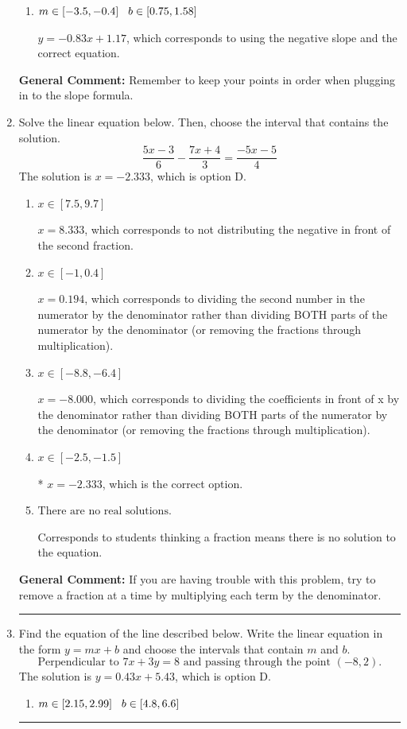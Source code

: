 \documentclass{extbook}[14pt]
\newcommand{\litem}[1]{\item #1

\rule{\textwidth}{0.4pt}}
\begin{document}
\begin{enumerate}
{\begin{enumerate}[label=\Alph*.]
* $y = 0.83x -7.17$, which is the correct option.
\item \( m \in [-3.5, -0.4] \hspace*{3mm} b \in [0.75, 1.58] \)

 $y = -0.83x + 1.17$, which corresponds to using the negative slope and the correct equation.
\end{enumerate}

\textbf{General Comment:} Remember to keep your points in order when plugging in to the slope formula.
}
\litem{
Solve the linear equation below. Then, choose the interval that contains the solution.
\[ \frac{5x -3}{6} - \frac{7x + 4}{3} = \frac{-5x -5}{4} \]The solution is \( x = -2.333 \), which is option D.\begin{enumerate}[label=\Alph*.]
\item \( x \in [7.5, 9.7] \)

 $x = 8.333$, which corresponds to not distributing the negative in front of the second fraction.
\item \( x \in [-1, 0.4] \)

 $x = 0.194$, which corresponds to dividing the second number in the numerator by the denominator rather than dividing BOTH parts of the numerator by the denominator (or removing the fractions through multiplication).
\item \( x \in [-8.8, -6.4] \)

 $x = -8.000$, which corresponds to dividing the coefficients in front of x by the denominator rather than dividing BOTH parts of the numerator by the denominator (or removing the fractions through multiplication).
\item \( x \in [-2.5, -1.5] \)

* $x = -2.333$, which is the correct option.
\item \( \text{There are no real solutions.} \)

Corresponds to students thinking a fraction means there is no solution to the equation.
\end{enumerate}

\textbf{General Comment:} If you are having trouble with this problem, try to remove a fraction at a time by multiplying each term by the denominator.
}
\litem{
Find the equation of the line described below. Write the linear equation in the form $ y=mx+b $ and choose the intervals that contain $m$ and $b$.
\[ \text{Perpendicular to } 7 x + 3 y = 8 \text{ and passing through the point } (-8, 2). \]The solution is \( y = 0.43x + 5.43 \), which is option D.\begin{enumerate}[label=\Alph*.]
\item \( m \in [2.15, 2.99] \hspace*{3mm} b \in [4.8, 6.6] \)


\end{enumerate}}
\end{enumerate}
\end{document}
